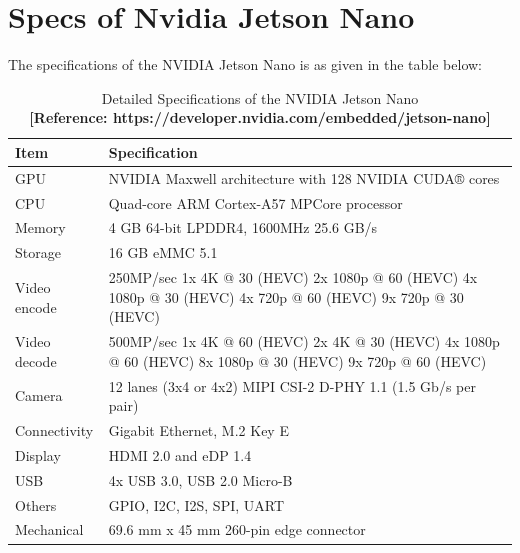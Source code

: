 \section{Specs of Nvidia Jetson Nano}
The specifications of the NVIDIA Jetson Nano is as given in the table below:\\
\begin{table}
	\begin{tabular}{||m{5cm}|m{10cm}||}
		\hline
		\textbf{Item} & \textbf{Specification}\\
		\hline
		GPU & NVIDIA Maxwell architecture with 128 NVIDIA CUDA® cores\\
		\hline
		CPU & Quad-core ARM Cortex-A57 MPCore processor\\
		\hline
		Memory & 4 GB 64-bit LPDDR4, 1600MHz 25.6 GB/s\\
		\hline
		Storage & 16 GB eMMC 5.1\\
		\hline
		Video encode & 250MP/sec
		1x 4K @ 30 (HEVC)
		2x 1080p @ 60 (HEVC)
		4x 1080p @ 30 (HEVC)
		4x 720p @ 60 (HEVC)
		9x 720p @ 30 (HEVC)\\
		\hline
		Video decode & 500MP/sec
		1x 4K @ 60 (HEVC)
		2x 4K @ 30 (HEVC)
		4x 1080p @ 60 (HEVC)
		8x 1080p @ 30 (HEVC)
		9x 720p @ 60 (HEVC)\\
		\hline
		Camera & 12 lanes (3x4 or 4x2) MIPI CSI-2 D-PHY 1.1 (1.5 Gb/s per pair)\\
		\hline
		Connectivity & Gigabit Ethernet, M.2 Key E\\
		\hline
		Display & HDMI 2.0 and eDP 1.4\\
		\hline
		USB & 4x USB 3.0, USB 2.0 Micro-B\\
		\hline
		Others & GPIO, I2C, I2S, SPI, UART\\
		\hline
		Mechanical & 69.6 mm x 45 mm
		260-pin edge connector\\
		\hline
	\end{tabular}
\caption{\label{tab:NVIDIA Jetson Nano Specification}Detailed Specifications of the NVIDIA Jetson Nano\\ \textbf{[Reference: https://developer.nvidia.com/embedded/jetson-nano]}}
\end{table}

